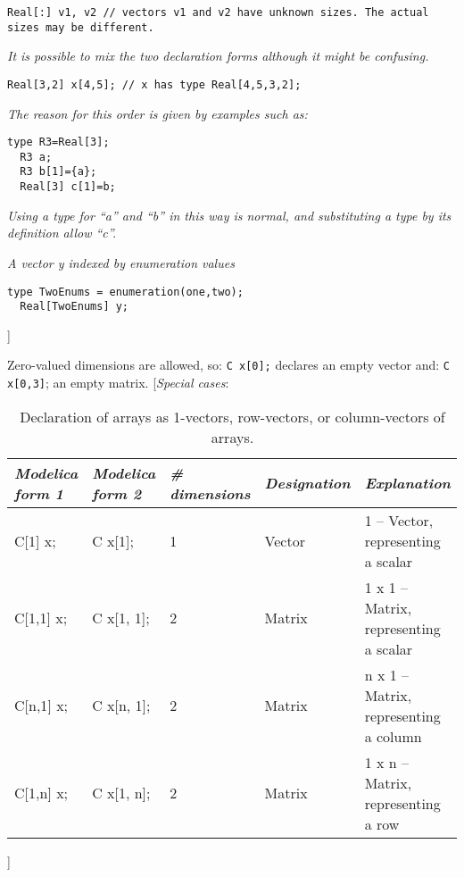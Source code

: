 \begin{lstlisting}[language=modelica]
  Real[:] v1, v2 // vectors v1 and v2 have unknown sizes. The actual sizes may be different.
\end{lstlisting}

\emph{It is possible to mix the two declaration forms although it might
be confusing.}

\begin{lstlisting}[language=modelica]
  Real[3,2] x[4,5]; // x has type Real[4,5,3,2];
\end{lstlisting}
\emph{The reason for this order is given by examples such as:}

\begin{lstlisting}[language=modelica]
  type R3=Real[3];
  R3 a;
  R3 b[1]={a};
  Real[3] c[1]=b;
\end{lstlisting}
\emph{Using a type for ``a'' and ``b'' in this way is normal, and
substituting a type by its definition allow ``c''.}

\emph{A vector y indexed by enumeration values}

\begin{lstlisting}[language=modelica]
  type TwoEnums = enumeration(one,two);
  Real[TwoEnums] y;
\end{lstlisting}
{]}

Zero-valued dimensions are allowed, so: \lstinline!C x[0];! declares an empty
  vector and: \lstinline!C x[0,3]!; an empty matrix.
{[}\emph{Special cases}:

\begin{longtable}{|l|l|l|l|p{3cm}|}
\caption{Declaration of arrays as 1-vectors, row-vectors, or
column-vectors of arrays.}\\
\hline
\emph{Modelica form 1} & \emph{Modelica form 2} & \emph{\# dimensions} &
\emph{Designation} & \emph{Explanation}\\ \hline
\endhead
C{[}1{]} x; & C x{[}1{]};  & 1 & Vector & 1 -- Vector, representing a scalar\\ \hline
C{[}1,1{]} x; & C x{[}1, 1{]}; & 2 & Matrix & 1 x 1 -- Matrix, representing a scalar\\ \hline
C{[}n,1{]} x; & C x{[}n, 1{]}; & 2 & Matrix & n x 1 -- Matrix, representing a column\\ \hline
C{[}1,n{]} x; & C x{[}1, n{]}; & 2 & Matrix & 1 x n -- Matrix, representing a row\\ \hline
\end{longtable}

{]}

